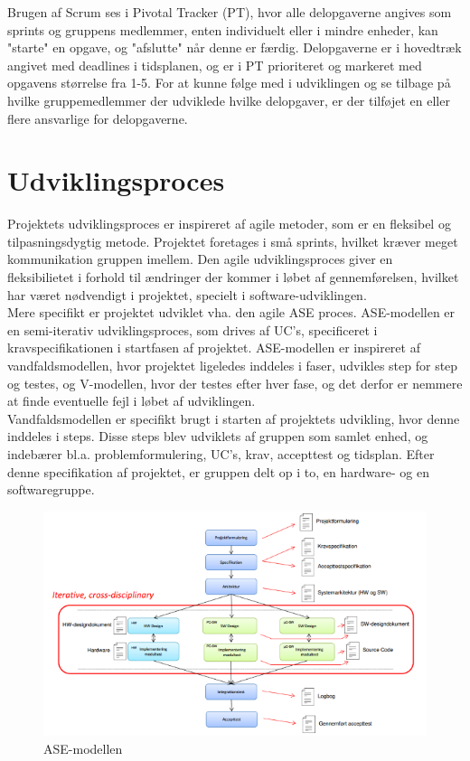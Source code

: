 Brugen af Scrum ses i Pivotal Tracker (PT), hvor alle delopgaverne angives som sprints og gruppens medlemmer, enten individuelt eller i mindre enheder, kan "starte" en opgave, og "afslutte" når denne er færdig. Delopgaverne er i hovedtræk angivet med deadlines i tidsplanen, og er i PT prioriteret og markeret med opgavens størrelse fra 1-5. For at kunne følge med i udviklingen og se tilbage på hvilke gruppemedlemmer der udviklede hvilke delopgaver, er der tilføjet en eller flere ansvarlige for delopgaverne. 

\section{Udviklingsproces}
Projektets udviklingsproces er inspireret af agile metoder, som er en fleksibel og tilpasningsdygtig metode. Projektet foretages i små sprints, hvilket kræver meget kommunikation gruppen imellem. Den agile udviklingsproces giver en fleksibilietet i forhold til ændringer der kommer i løbet af gennemførelsen, hvilket har været nødvendigt i projektet, specielt i software-udviklingen.\\
\newline
Mere specifikt er projektet udviklet vha. den agile ASE proces. ASE-modellen er en semi-iterativ udviklingsproces, som drives af UC's, specificeret i kravspecifikationen i startfasen af projektet. ASE-modellen er inspireret af vandfaldsmodellen, hvor projektet ligeledes inddeles i faser, udvikles step for step og testes, og V-modellen, hvor der testes efter hver fase, og det derfor er nemmere at finde eventuelle fejl i løbet af udviklingen.\\
\newline
Vandfaldsmodellen er specifikt brugt i starten af projektets udvikling, hvor denne inddeles i steps. Disse steps blev udviklets af gruppen som samlet enhed, og indebærer bl.a. problemformulering, UC's, krav, accepttest og tidsplan. Efter denne specifikation af projektet, er gruppen delt op i to, en hardware- og en softwaregruppe.

\begin{figure}[H]
\centering
\includegraphics[scale=0.80]{ase.PNG}
\caption{ASE-modellen}
\end{figure}

